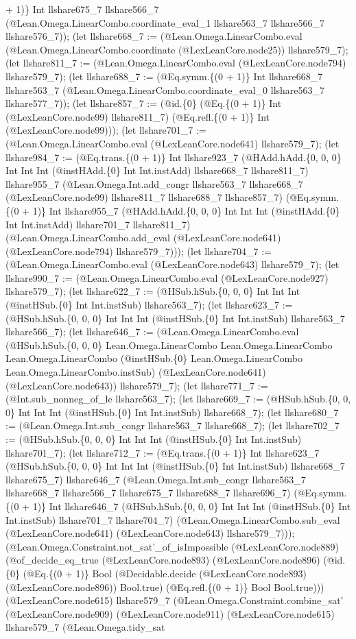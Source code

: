 \documentclass[11pt]{article}
\begin{document}
+ 1)\} Int llshare675\_7 llshare566\_7 (@Lean.Omega.LinearCombo.coordinate\_eval\_1 llshare563\_7 llshare566\_7 llshare576\_7)); (let llshare668\_7 := (@Lean.Omega.LinearCombo.eval (@Lean.Omega.LinearCombo.coordinate (@LexLeanCore.node25)) llshare579\_7); (let llshare811\_7 := (@Lean.Omega.LinearCombo.eval (@LexLeanCore.node794) llshare579\_7); (let llshare688\_7 := (@Eq.symm.\{(0 + 1)\} Int llshare668\_7 llshare563\_7 (@Lean.Omega.LinearCombo.coordinate\_eval\_0 llshare563\_7 llshare577\_7)); (let llshare857\_7 := (@id.\{0\} (@Eq.\{(0 + 1)\} Int (@LexLeanCore.node99) llshare811\_7) (@Eq.refl.\{(0 + 1)\} Int (@LexLeanCore.node99))); (let llshare701\_7 := (@Lean.Omega.LinearCombo.eval (@LexLeanCore.node641) llshare579\_7); (let llshare984\_7 := (@Eq.trans.\{(0 + 1)\} Int llshare923\_7 (@HAdd.hAdd.\{0, 0, 0\} Int Int Int (@instHAdd.\{0\} Int Int.instAdd) llshare668\_7 llshare811\_7) llshare955\_7 (@Lean.Omega.Int.add\_congr llshare563\_7 llshare668\_7 (@LexLeanCore.node99) llshare811\_7 llshare688\_7 llshare857\_7) (@Eq.symm.\{(0 + 1)\} Int llshare955\_7 (@HAdd.hAdd.\{0, 0, 0\} Int Int Int (@instHAdd.\{0\} Int Int.instAdd) llshare701\_7 llshare811\_7) (@Lean.Omega.LinearCombo.add\_eval (@LexLeanCore.node641) (@LexLeanCore.node794) llshare579\_7))); (let llshare704\_7 := (@Lean.Omega.LinearCombo.eval (@LexLeanCore.node643) llshare579\_7); (let llshare990\_7 := (@Lean.Omega.LinearCombo.eval (@LexLeanCore.node927) llshare579\_7); (let llshare622\_7 := (@HSub.hSub.\{0, 0, 0\} Int Int Int (@instHSub.\{0\} Int Int.instSub) llshare563\_7); (let llshare623\_7 := (@HSub.hSub.\{0, 0, 0\} Int Int Int (@instHSub.\{0\} Int Int.instSub) llshare563\_7 llshare566\_7); (let llshare646\_7 := (@Lean.Omega.LinearCombo.eval (@HSub.hSub.\{0, 0, 0\} Lean.Omega.LinearCombo Lean.Omega.LinearCombo Lean.Omega.LinearCombo (@instHSub.\{0\} Lean.Omega.LinearCombo Lean.Omega.LinearCombo.instSub) (@LexLeanCore.node641) (@LexLeanCore.node643)) llshare579\_7); (let llshare771\_7 := (@Int.sub\_nonneg\_of\_le llshare563\_7); (let llshare669\_7 := (@HSub.hSub.\{0, 0, 0\} Int Int Int (@instHSub.\{0\} Int Int.instSub) llshare668\_7); (let llshare680\_7 := (@Lean.Omega.Int.sub\_congr llshare563\_7 llshare668\_7); (let llshare702\_7 := (@HSub.hSub.\{0, 0, 0\} Int Int Int (@instHSub.\{0\} Int Int.instSub) llshare701\_7); (let llshare712\_7 := (@Eq.trans.\{(0 + 1)\} Int llshare623\_7 (@HSub.hSub.\{0, 0, 0\} Int Int Int (@instHSub.\{0\} Int Int.instSub) llshare668\_7 llshare675\_7) llshare646\_7 (@Lean.Omega.Int.sub\_congr llshare563\_7 llshare668\_7 llshare566\_7 llshare675\_7 llshare688\_7 llshare696\_7) (@Eq.symm.\{(0 + 1)\} Int llshare646\_7 (@HSub.hSub.\{0, 0, 0\} Int Int Int (@instHSub.\{0\} Int Int.instSub) llshare701\_7 llshare704\_7) (@Lean.Omega.LinearCombo.sub\_eval (@LexLeanCore.node641) (@LexLeanCore.node643) llshare579\_7))); (@Lean.Omega.Constraint.not\_sat'\_of\_isImpossible (@LexLeanCore.node889) (@of\_decide\_eq\_true (@LexLeanCore.node893) (@LexLeanCore.node896) (@id.\{0\} (@Eq.\{(0 + 1)\} Bool (@Decidable.decide (@LexLeanCore.node893) (@LexLeanCore.node896)) Bool.true) (@Eq.refl.\{(0 + 1)\} Bool Bool.true))) (@LexLeanCore.node615) llshare579\_7 (@Lean.Omega.Constraint.combine\_sat' (@LexLeanCore.node909) (@LexLeanCore.node911) (@LexLeanCore.node615) llshare579\_7 (@Lean.Omega.tidy\_sat 
\end{document}
